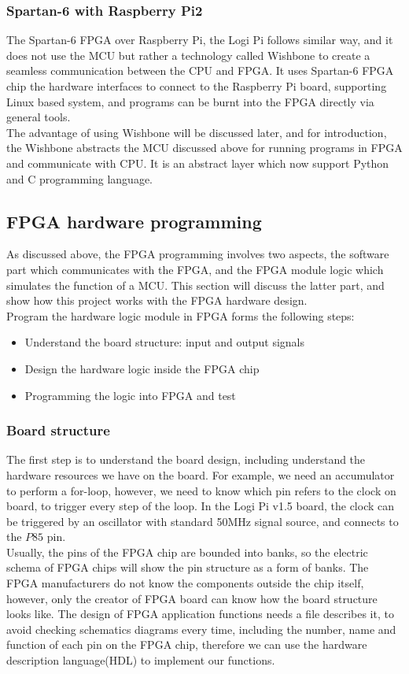 \documentclass[11pt,openright,a4paper]{report}
\begin{document}
\subsubsection{Spartan-6 with Raspberry Pi2}
The Spartan-6 FPGA over Raspberry Pi, the Logi Pi follows similar way, and it does not use the MCU but rather a technology called Wishbone to create a seamless communication between the CPU and FPGA. It uses Spartan-6 FPGA chip the hardware interfaces to connect to the Raspberry Pi board, supporting Linux based system, and programs can be burnt into the FPGA directly via general tools.\\
The advantage of using Wishbone will be discussed later, and for introduction, the Wishbone abstracts the MCU discussed above for running programs in FPGA and communicate with CPU. It is an abstract layer which now support Python and C programming language.\\

\subsection{FPGA hardware programming}
As discussed above, the FPGA programming involves two aspects, the software part which communicates with the FPGA, and the FPGA module logic which simulates the function of a MCU. This section will discuss the latter part, and show how this project works with the FPGA hardware design.\\
Program the hardware logic module in FPGA forms the following steps:
\begin{itemize}
	\item Understand the board structure: input and output signals
	\item Design the hardware logic inside the FPGA chip
	\item Programming the logic into FPGA and test
\end{itemize}
\subsubsection{Board structure}
The first step is to understand the board design, including understand the hardware resources we have on the board. For example, we need an accumulator to perform a for-loop, however, we need to know which pin refers to the clock on board, to trigger every step of the loop. In the Logi Pi v1.5 board, the clock can be triggered by an oscillator with standard 50MHz signal source, and connects to the $P85$ pin. \\
Usually, the pins of the FPGA chip are bounded into banks, so the electric schema of FPGA chips will show the pin structure as a form of banks. The FPGA manufacturers do not know the components outside the chip itself, however, only the creator of FPGA board can know how the board structure looks like. The design of FPGA application functions needs a file describes it, to avoid checking schematics diagrams every time, including the number, name and function of each pin on the FPGA chip, therefore we can use the hardware description language(HDL) to implement our functions.\\
\end{document}
